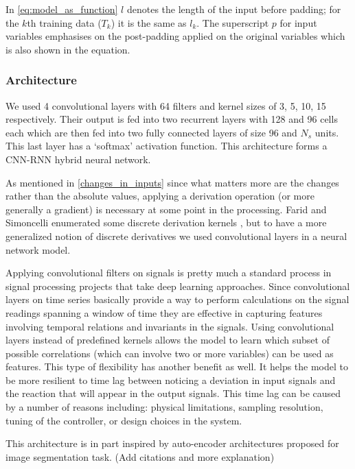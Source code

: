 In \eqref{eq:model_as_function} $l$ denotes the length of the input before padding; for the $k$th training data ($T_k$) it is the same as $l_k$. The superscript $p$ for input variables emphasises on the post-padding applied on the original variables which is also shown in the equation.

\subsubsection{Architecture}
We used 4 convolutional layers with 64 filters and kernel sizes of 3, 5, 10, 15 respectively.
Their output is fed into two recurrent layers with 128 and 96 cells each which are then fed into two fully connected layers of size 96 and $N_s$ units. This last layer has a `softmax' activation function.
This architecture forms a CNN-RNN hybrid neural network. \cite{wang2017time}

As mentioned in \ref{changes_in_inputs} since what matters more are the changes rather than the absolute values, applying a derivation operation (or more generally a gradient) is necessary at some point in the processing. 
Farid and Simoncelli enumerated some discrete derivation kernels \cite{Farid2004}, but to have a more generalized notion of discrete derivatives we used convolutional layers in a neural network model. 

Applying convolutional filters on signals is pretty much a standard process in signal processing projects that take deep learning approaches.  \cite{morales2016deep, zeng2014convolutional, yang2015deep} Since convolutional layers on time series basically provide a way to perform calculations on the signal readings spanning a window of time they are effective in capturing features involving temporal relations and invariants in the signals. \cite{wang2017time} 
Using convolutional layers instead of predefined kernels allows the model to learn which subset of possible correlations (which can involve two or more variables) can be used as features. This type of flexibility has another benefit as well. It helps the model to be more resilient to time lag between noticing a deviation in input signals and the reaction that will appear in the output signals. This time lag can be caused by a number of reasons including: physical limitations, sampling resolution, tuning of the controller, or design choices in the system.

This architecture is in part inspired by auto-encoder architectures proposed for image segmentation task. (Add citations and more explanation)